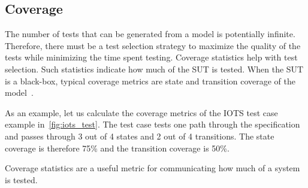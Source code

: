 \subsection{Coverage}\label{sec:coverage}
The number of tests that can be generated from a model is potentially infinite. Therefore, there must be a test selection strategy to maximize the quality of the tests while minimizing the time spent testing. Coverage statistics help with test selection. Such statistics indicate how much of the SUT is tested. When the SUT is a black-box, typical coverage metrics are state and transition coverage of the model~\cite{Lee:testing, Nachmanson:testing, Hasan:testing}.

As an example, let us calculate the coverage metrics of the IOTS test case example in~\ref{fig:iots_test}. The test case tests one path through the specification and passes through 3 out of 4 states and 2 out of 4 transitions. The state coverage is therefore 75\% and the transition coverage is 50\%.

Coverage statistics are a useful metric for communicating how much of a system is tested.


